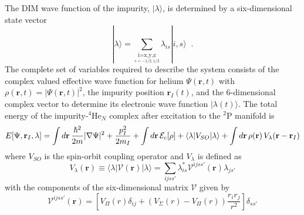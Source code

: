 \documentclass[12pt,a4paper,twosides]{book}
\begin{document}
			The DIM wave function of the impurity, $|\lambda\rangle$, is determined by a six-dimensional state vector
			\begin{equation}
			|\lambda \rangle = \sum_{\mathop{i=x,y,z}\limits_{s=-1/2,1/2}} \lambda_{is} |i,s \rangle \;\; .
			\label{eq42}
			\end{equation}
			The complete set of variables required to describe the
			system consists of the complex valued effective wave function for helium $\Psi(\mathbf{r}, t)$ with
			$\rho(\mathbf{r}, t) = |\Psi(\mathbf{r}, t)|^2$, the impurity position $\mathbf{r}_I(t)$, and the 6-dimensional complex vector to determine 
			its electronic wave function $|\lambda(t)\rangle$. The total energy of the impurity-$^4$He$_N$ complex after excitation to the $^2$P manifold is
			\begin{equation}
			E[\Psi, \mathbf{r}_I, \lambda] =
			\int d \mathbf{r} \,
			\frac{\hbar^2}{2m}|\nabla \Psi|^2
			+
			\frac{p^2_I}{2 m_I}
			+
			\int d \mathbf{r} \,
			{\cal E}_c[\rho]
			+
			\langle \lambda | V_{SO} |\lambda\rangle
			+ \int d \mathbf{r} \, \rho(\mathbf{r}) \,
			V_\lambda (\mathbf{r}- \mathbf{r}_I ) 
			\label{eq43}
			\end{equation}
			where $V_{SO}$ is the spin-orbit coupling operator and $V_\lambda$ is defined as
			\begin{equation}
			V_\lambda(\mathbf{r}) \equiv \langle \lambda | {\mathcal V}(\mathbf{r}) | \lambda\rangle = \sum_{ijss'}\lambda^*_{is}{\mathcal V}^{ijss'}(\mathbf{r})\lambda_{js'} 
			\label{eq44}
			\end{equation}
			with the components of the six-dimensional matrix ${\mathcal V}$ given by
			\begin{equation}
			{\mathcal V}^{ijss'}(\mathbf{r}) =\left[ V_\Pi(r)\delta_{ij} +
			\left(V_\Sigma(r)-V_\Pi(r)\right)\frac{r_i r_j}{r^2} \right]\delta_{ss'}
			\label{eq45}
			\end{equation}
			
\end{document}
